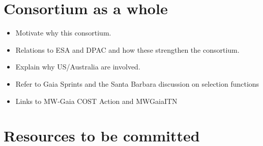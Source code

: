
\makemilestoneslist


\makerisklist

\section{Consortium as a whole}
\label{sec:consortium}

\begin{itemize}
    \item Motivate why this consortium.
    \item Relations to ESA and DPAC and how these strengthen the consortium.
    \item Explain why US/Australia are involved.
    \item Refer to Gaia Sprints and the Santa Barbara discussion on selection functions
    \item Links to MW-Gaia COST Action and MWGaiaITN
\end{itemize}

\section{Resources to be committed}
\label{sec:resources}

\makesummaryofefforttable


\makecoststable

